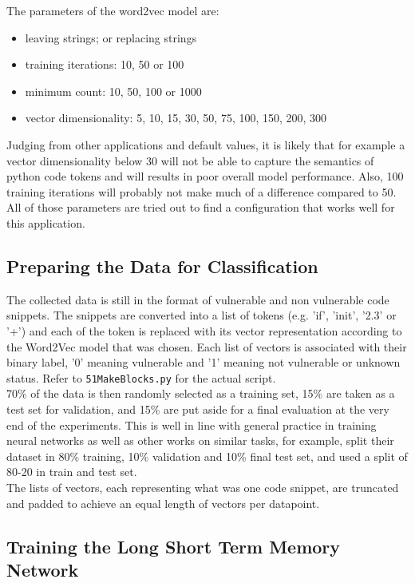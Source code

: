 \documentclass[
	a4paper,
	pagesize,
	pdftex,
	12pt,
	twoside, %
	BCOR=5mm, %
	ngerman,
	fleqn,
	final,
	]{scrartcl}
\begin{document}
The parameters of the word2vec model are:
\begin{itemize}[noitemsep]
	\item leaving strings; or replacing strings
	\item training iterations: 10, 50 or 100
	\item minimum count: 10, 50, 100 or 1000
	\item vector dimensionality: 5, 10, 15, 30, 50, 75, 100, 150, 200, 300
\end{itemize}

Judging from other applications and default values, it is likely that for example a vector dimensionality below 30 will not be able to capture the semantics of python code tokens and will results in poor overall model performance. Also, 100 training iterations will probably not make much of a difference compared to 50. All of those parameters are tried out to find a configuration that works well for this application.

\subsection{Preparing the Data for Classification}
The collected data is still in the format of vulnerable and non vulnerable code snippets. The snippets are converted into a list of tokens (e.g. 'if', 'init', '2.3' or '+') and each of the token is replaced with its vector representation according to the Word2Vec model that was chosen. Each list of vectors is associated with their binary label, '0' meaning vulnerable and '1' meaning not vulnerable or unknown status. Refer to \texttt{51MakeBlocks.py} for the actual script.\\
70\% of the data is then randomly selected as a training set, 15\% are taken as a test set for validation, and 15\% are put aside for a final evaluation at the very end of the experiments. This is well in line with general practice in training neural networks as well as other works on similar tasks, for example, \cite{Russell.2018} split their dataset in 80\% training, 10\% validation and 10\% final test set, and \cite{Li.2018} used a split of 80-20 in train and test set. \\
The lists of vectors, each representing what was one code snippet, are truncated and padded to achieve an equal length of vectors per datapoint.

\subsection{Training the Long Short Term Memory Network}
\end{document}

